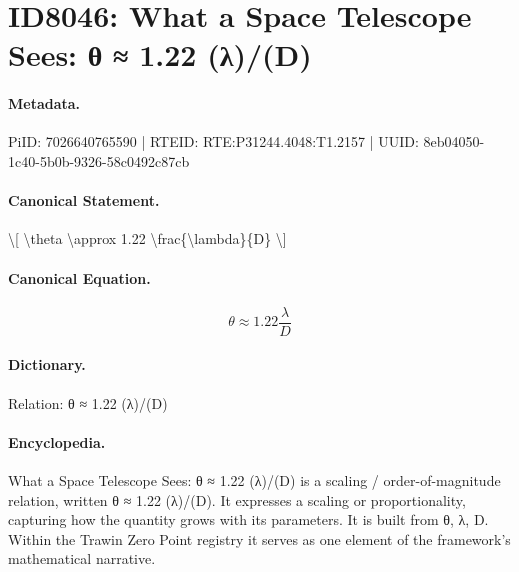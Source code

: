 \section*{ID8046: What a Space Telescope Sees: θ ≈ 1.22 (λ)/(D)}
\paragraph{Metadata.}
PiID: 7026640765590 | RTEID: RTE:P31244.4048:T1.2157 | UUID: 8eb04050-1c40-5b0b-9326-58c0492c87cb

\paragraph{Canonical Statement.}
\textbackslash{}[ \textbackslash{}theta \textbackslash{}approx 1.22 \textbackslash{}frac\{\textbackslash{}lambda\}\{D\} \textbackslash{}]

\paragraph{Canonical Equation.}
\[
\theta \approx 1.22 \frac{\lambda}{D}
\]

\paragraph{Dictionary.}
Relation: θ ≈ 1.22 (λ)/(D)

\paragraph{Encyclopedia.}
What a Space Telescope Sees: θ ≈ 1.22 (λ)/(D) is a scaling / order-of-magnitude relation, written θ ≈ 1.22 (λ)/(D). It expresses a scaling or proportionality, capturing how the quantity grows with its parameters. It is built from θ, λ, D. Within the Trawin Zero Point registry it serves as one element of the framework's mathematical narrative.
